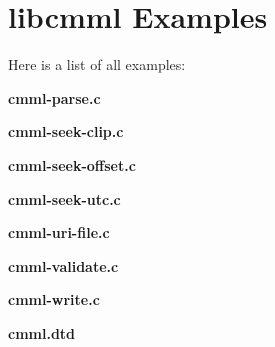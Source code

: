 \section{libcmml Examples}
Here is a list of all examples:\begin{CompactItemize}
\item 
{\bf cmml-parse.c}
\item 
{\bf cmml-seek-clip.c}
\item 
{\bf cmml-seek-offset.c}
\item 
{\bf cmml-seek-utc.c}
\item 
{\bf cmml-uri-file.c}
\item 
{\bf cmml-validate.c}
\item 
{\bf cmml-write.c}
\item 
{\bf cmml.dtd}
\end{CompactItemize}
